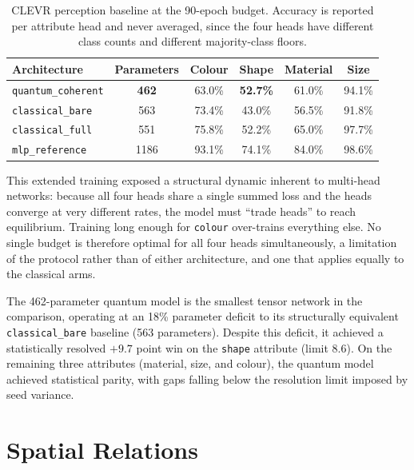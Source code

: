 \documentclass[12pt, a4paper, oneside]{report}
\begin{document}
\begin{table}[hbt!]
    \centering
    \begin{tabular}{l c | c c c c}
        \toprule
        \textbf{Architecture} & \textbf{Parameters} & \textbf{Colour} & \textbf{Shape} & \textbf{Material} & \textbf{Size} \\
        \midrule
        \texttt{quantum\_coherent} & \textbf{462} & 63.0\% & \textbf{52.7\%} & 61.0\% & 94.1\% \\
        \midrule
        \texttt{classical\_bare} & 563 & 73.4\% & 43.0\% & 56.5\% & 91.8\% \\
        \texttt{classical\_full} & 551 & 75.8\% & 52.2\% & 65.0\% & 97.7\% \\
        \midrule
        \texttt{mlp\_reference} & 1186 & 93.1\% & 74.1\% & 84.0\% & 98.6\% \\
        \bottomrule
    \end{tabular}
    \caption{CLEVR perception baseline at the 90-epoch budget. Accuracy is reported per attribute head and never averaged, since the four heads have different class counts and different majority-class floors.}
    \label{tab:perception_results}
\end{table}

This extended training exposed a structural dynamic inherent to multi-head networks: because all four heads share a single summed loss and the heads converge at very different rates, the model must ``trade heads'' to reach equilibrium. Training long enough for \texttt{colour} over-trains everything else. No single budget is therefore optimal for all four heads simultaneously, a limitation of the protocol rather than of either architecture, and one that applies equally to the classical arms.

The 462-parameter quantum model is the smallest tensor network in the comparison, operating at an 18\% parameter deficit to its structurally equivalent \texttt{classical\_bare} baseline (563 parameters). Despite this deficit, it achieved a statistically resolved $+9.7$ point win on the \texttt{shape} attribute (limit $8.6$). On the remaining three attributes (material, size, and colour), the quantum model achieved statistical parity, with gaps falling below the resolution limit imposed by seed variance.

\section{Spatial Relations}
\end{document}
